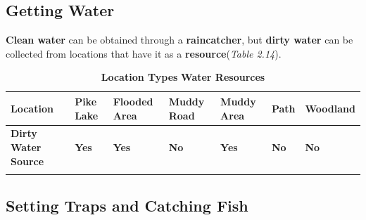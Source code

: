 		\subsection{Getting Water}
			\par \textbf{Clean water} can be obtained through a \textbf{raincatcher}, but \textbf{dirty water} can be collected from locations that have it as a \textbf{resource}(\textit{Table 2.14}).
			\begin{longtable}{|C{7em}|C{3.5em}|C{4.5em}|C{4.5em}|C{4.5em}|C{3.5em}|C{5em}|}
			   \toprule
			    \textcolor[rgb]{ 1,  1,  1}{\textbf{Location}} & \textbf{Pike Lake} & \textbf{Flooded Area} & \textbf{Muddy Road} & \textbf{Muddy Area} & \textbf{Path} & \textbf{Woodland} \\
			  \midrule			    
			   \textcolor[rgb]{ 1,  1,  1}{\textbf{Dirty Water Source}} & \textbf{Yes} & \textbf{Yes} & \textbf{No} & \textbf{Yes} & \textbf{No} & \textbf{No} \\
			    \bottomrule	
			\caption{\textbf{Location Types} \textbf{Water Resources}}
			\end{longtable}
		
		\subsection{Setting Traps and Catching Fish}
		
